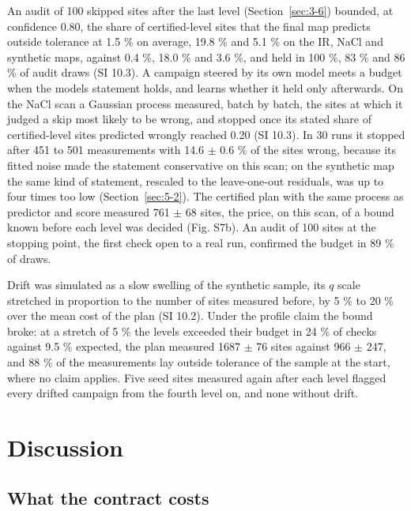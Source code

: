 \documentclass{iopjournal}
\begin{document}
An audit of 100 skipped sites after the last level (Section~\ref{sec:3-6}) bounded, at confidence 0.80, the share of certified-level sites that the final map predicts outside tolerance at 1.5 \% on average, 19.8 \% and 5.1 \% on the IR, NaCl and synthetic maps, against 0.4 \%, 18.0 \% and 3.6 \%, and held in 100 \%, 83 \% and 86 \% of audit draws (SI 10.3). A campaign steered by its own model meets a budget when the model\textquotesingle s statement holds, and learns whether it held only afterwards. On the NaCl scan a Gaussian process measured, batch by batch, the sites at which it judged a skip most likely to be wrong, and stopped once its stated share of certified-level sites predicted wrongly reached 0.20 (SI 10.3). In 30 runs it stopped after 451 to 501 measurements with 14.6 \ensuremath{\pm} 0.6 \% of the sites wrong, because its fitted noise made the statement conservative on this scan; on the synthetic map the same kind of statement, rescaled to the leave-one-out residuals, was up to four times too low (Section~\ref{sec:5-2}). The certified plan with the same process as predictor and score measured 761 \ensuremath{\pm} 68 sites, the price, on this scan, of a bound known before each level was decided (Fig. S7b). An audit of 100 sites at the stopping point, the first check open to a real run, confirmed the budget in 89 \% of draws.

Drift was simulated as a slow swelling of the synthetic sample, its \(q\) scale stretched in proportion to the number of sites measured before, by 5 \% to 20 \% over the mean cost of the plan (SI 10.2). Under the profile claim the bound broke: at a stretch of 5 \% the levels exceeded their budget in 24 \% of checks against 9.5 \% expected, the plan measured 1687 \ensuremath{\pm} 76 sites against 966 \ensuremath{\pm} 247, and 88 \% of the measurements lay outside tolerance of the sample at the start, where no claim applies. Five seed sites measured again after each level flagged every drifted campaign from the fourth level on, and none without drift.

\hypertarget{sec:6}{%
\section{Discussion}\label{sec:6}}

\hypertarget{what-the-contract-costs}{%
\subsection{What the contract costs}\label{what-the-contract-costs}}
\end{document}
